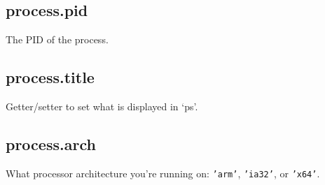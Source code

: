 \begin{Shaded}
\begin{Highlighting}[]
\NormalTok{(}\NormalTok{, }\NormalTok{() \{}
  \NormalTok{(}\NormalTok{);}
\NormalTok{\});}

\NormalTok{() \{}
  \NormalTok{(}\NormalTok{);}
  \NormalTok{(}\NormalTok{);}
\NormalTok{\}, }\NormalTok{);}

\NormalTok{(}\NormalTok{, }\NormalTok{);}
\end{Highlighting}
\end{Shaded}

\subsection{process.pid}

The PID of the process.

\begin{Shaded}
\begin{Highlighting}[]
\NormalTok{(} \NormalTok{+ }\NormalTok{);}
\end{Highlighting}
\end{Shaded}

\subsection{process.title}

Getter/setter to set what is displayed in `ps'.

\subsection{process.arch}

What processor architecture you're running on: \texttt{'arm'},
\texttt{'ia32'}, or \texttt{'x64'}.

\begin{Shaded}
\begin{Highlighting}[]
\NormalTok{(} \NormalTok{+ }\NormalTok{);}
\end{Highlighting}
\end{Shaded}

